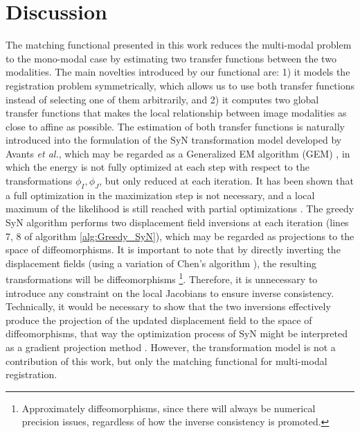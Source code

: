 \section{Discussion}
The matching functional presented in this work reduces the multi-modal problem to the mono-modal case by estimating two transfer functions between the two modalities. The main novelties introduced by our functional are: 1) it models the registration problem symmetrically, which allows us to use both transfer functions instead of selecting one of them arbitrarily, and 2) it computes two global transfer functions that makes the local relationship between image modalities as close to affine as possible. The estimation of both transfer functions is naturally introduced into the formulation of the SyN transformation model developed by Avants {\it et al.}\cite{Avants2008, Avants2011}, which may be regarded as a Generalized EM algorithm (GEM) \cite{Neal1998}, in which the energy is not fully optimized at each step with respect to the transformations $\phi_{I}, \phi_{J}$, but only reduced at each iteration. It has been shown that a full optimization in the maximization step is not necessary, and a local maximum of the likelihood is still reached with partial optimizations \cite{Neal1998}. The greedy SyN algorithm performs two displacement field inversions at each iteration (lines 7, 8 of algorithm \ref{alg:Greedy_SyN}), which may be regarded as projections to the space of diffeomorphisms. It is important to note that by directly inverting the displacement fields (using a variation of Chen's algorithm \cite{Chen2008}), the resulting transformations will be diffeomorphisms \footnote{Approximately diffeomorphisms, since there will always be numerical precision issues, regardless of how the inverse consistency is promoted.}\cite{Avants2008, Avants2011}. Therefore, it is unnecessary to introduce any constraint on the local Jacobians to ensure inverse consistency. Technically, it would be necessary to show that the two inversions effectively produce the projection of the updated displacement field to the space of diffeomorphisms, that way the optimization process of SyN might be interpreted as a gradient projection method \cite{Xiu2007}. However, the transformation model is not a contribution of this work, but only the matching functional for multi-modal registration.\\

